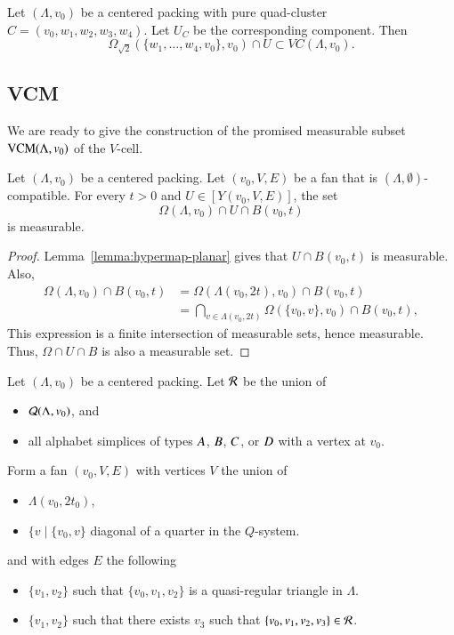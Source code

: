\begin{lemma}
Let $(\Lambda,v_0)$ be a centered packing with pure quad-cluster $C=(v_0,w_1,w_2,w_3,w_4)$.  Let $U_C$ be the corresponding component.
Then
  $$
  \Omega_{\sqrt2}(\{w_1,\ldots,w_4,v_0\},v_0) \cap U \subset 
  VC(\Lambda,v_0).
  $$
\end{lemma}

\subsection{VCM}
\label{sec:VCM}

We are ready to give 
the construction of the promised measurable subset ${\operatorname{VCM}}(\Lambda,v_0)$ of the $V$-cell.


\begin{lemma}
Let $(\Lambda,v_0)$ be a centered packing.  Let $(v_0,V,E)$ be a fan
that is $(\Lambda,\emptyset)$-compatible.  For every $t>0$ and
$U\in[Y(v_0,V,E)]$, the set
  $$
  \Omega(\Lambda,v_0)\cap U \cap B(v_0,t)
  $$
is measurable.
\end{lemma}

\begin{proof}  Lemma~\ref{lemma:hypermap-planar} 
gives that $U\cap B(v_0,t)$ is measurable.
Also,
  $$
  \begin{array}{lll}
  \Omega(\Lambda,v_0)\cap B(v_0,t) &= \Omega(\Lambda(v_0,2t),v_0) 
    \cap B(v_0,t) \\
    &= \bigcap _{v\in\Lambda(v_0,2t)} \Omega(\{v_0,v\},v_0) \cap B(v_0,t),
  \end{array}
  $$
This expression is a finite
intersection of measurable sets, hence measurable.  Thus, $\Omega\cap U\cap B$ is also a measurable set.
\end{proof}

Let $(\Lambda,v_0)$ be a centered packing.  Let ${\mathcal R}$ be the union of 
\begin{itemize}
  \item ${\mathcal Q}(\Lambda,v_0)$, and
  \item all alphabet simplices of types $A$, $B$, $C$, or $D$ with a vertex at $v_0$.  
\end{itemize}
Form a fan $(v_0,V,E)$ with vertices $V$ the union of
\begin{itemize}
  \item $\Lambda(v_0,2t_0)$,
  \item $\{v \mid \{v_0,v\}$  diagonal of a quarter in the  $Q$-system.
\end{itemize}
and with edges $E$ the following
\begin{itemize}
  \item $\{v_1,v_2\}$ such that $\{v_0,v_1,v_2\}$ is a quasi-regular triangle in $\Lambda$.
  \item $\{v_1,v_2\}$ such that there exists $v_3$ such that $\{v_0,v_1,v_2,v_3\}\in{\mathcal R}$.
\end{itemize}

